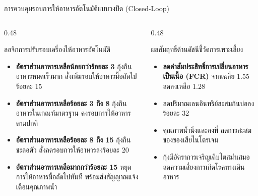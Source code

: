 \documentclass[aspectratio=169, 10pt]{beamer}
\begin{document}
\begin{frame}{การควบคุมรอบการให้อาหารอัตโนมัติแบบวงปิด (Closed-Loop)}
\begin{columns}[T]
    \begin{column}{0.48\textwidth}
        \begin{mastercard}{ลอจิกการปรับรอบเครื่องให้อาหารอัตโนมัติ}
            \begin{itemize}
                \item \textbf{อัตราส่วนอาหารเหลือน้อยกว่าร้อยละ 3} กุ้งกินอาหารหมดเร็วมาก สั่งเพิ่มรอบให้อาหารมื้อถัดไปร้อยละ 15
                \item \textbf{อัตราส่วนอาหารเหลือร้อยละ 3 ถึง 8} กุ้งกินอาหารในเกณฑ์มาตรฐาน คงรอบการให้อาหารตามปกติ
                \item \textbf{อัตราส่วนอาหารเหลือร้อยละ 8 ถึง 15} กุ้งกินชะลอตัว สั่งลดรอบการให้อาหารลงร้อยละ 20
                \item \textbf{อัตราส่วนอาหารเหลือมากกว่าร้อยละ 15} หยุดการให้อาหารมื้อถัดไปทันที พร้อมส่งสัญญาณแจ้งเตือนคุณภาพน้ำ
            \end{itemize}
        \end{mastercard}
    \end{column}
    \begin{column}{0.48\textwidth}
        \begin{aquacard}{ผลสัมฤทธิ์ด้านดัชนีชี้วัดการเพาะเลี้ยง}
            \begin{itemize}
                \item \textbf{ลดค่าสัมประสิทธิ์การเปลี่ยนอาหารเป็นเนื้อ (FCR)} จากเฉลี่ย 1.55 ลดลงเหลือ 1.28
                \item ลดปริมาณเลนอินทรีย์สะสมก้นบ่อลงร้อยละ 32
                \item คุณภาพน้ำนิ่งและคงที่ ลดการสะสมของของเสียไนโตรเจน
                \item กุ้งมีอัตราการเจริญเติบโตสม่ำเสมอ ลดความเสี่ยงการเกิดโรคทางเดินอาหาร
            \end{itemize}
        \end{aquacard}
    \end{column}
\end{columns}
\end{frame}
\end{document}
